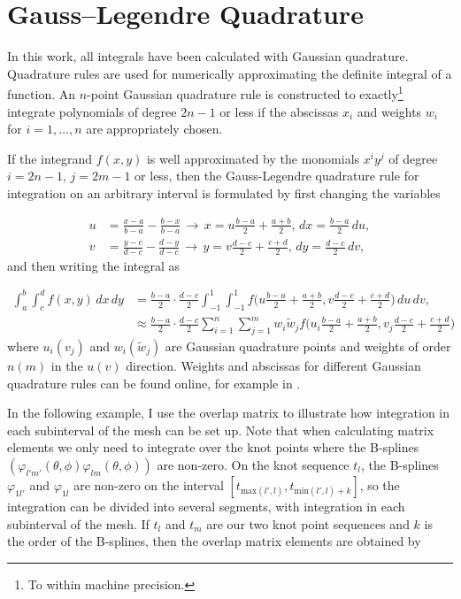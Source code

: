 \section{Gauss--Legendre Quadrature}
In this work, all integrals have been calculated with Gaussian quadrature. Quadrature rules are used for numerically approximating the definite integral of a function. An $n$-point Gaussian quadrature rule is constructed to exactly\footnote{To within machine precision.} integrate polynomials of degree $2n-1$ or less if the abscissas $x_i$ and weights $w_i$ for $i=1,\ldots,n$ are appropriately chosen. 

If the integrand $f(x,y)$ is well approximated by the monomials $x^{i}y^{j}$ of degree $i = 2n-1, \, j = 2m-1$ or less, then the Gauss-Legendre quadrature rule for integration on an arbitrary interval is formulated by first changing the variables

\begin{equation}
\begin{aligned}
u &= \frac{x-a}{b-a} - \frac{b-x}{b-a} \, \rightarrow \, x= u\frac{b-a}{2}+\frac{a+b}{2}, \,dx=\frac{b-a}{2}\,du, \\
v &= \frac{y-c}{d-c} - \frac{d-y}{d-c} \, \rightarrow \, y= v\frac{d-c}{2}+\frac{c+d}{2}, \,dy=\frac{d-c}{2}\,dv,
\end{aligned}
\end{equation} 
and then writing the integral as

\begin{equation}
\begin{aligned}
\int_{a}^{b} \int_{c}^{d}f(x,y) \,dx\,dy &= \frac{b-a}{2} \cdot \frac{d-c}{2} \int_{-1}^{1} \int_{-1}^{1}f \bigg( u\frac{b-a}{2} + \frac{a+b}{2},v\frac{d-c}{2} + \frac{c+d}{2} \bigg) \,du\,dv,\\
&\approx \frac{b-a}{2} \cdot \frac{d-c}{2} \sum_{i=1}^{n}\sum_{j=1}^{m}w_i \tilde{w}_j f\bigg( u_i\frac{b-a}{2} + \frac{a+b}{2},v_j\frac{d-c}{2} + \frac{c+d}{2}\bigg)
\end{aligned}
\end{equation}
where $u_i (v_j)$ and $w_i (\tilde{w}_j)$ are Gaussian quadrature points and weights of order $n (m)$ in the $u (v)$ direction. Weights and abscissas for different Gaussian quadrature rules can be found online, for example in \cite{NumericalRecipes}.

In the following example, I use the overlap matrix to illustrate how integration in each subinterval of the mesh can be set up. Note that when calculating matrix elements we only need to integrate over the knot points where the B-splines $(\varphi_{l'm'}(\theta,\phi)\varphi_{lm}(\theta,\phi))$ are non-zero. On the knot sequence $t_{l}$, the B-splines $\varphi_{1l'}$ and $\varphi_{1l}$ are non-zero on the interval $[t_{\text{max}(l',l)},t_{\text{min}(l',l)+k}]$, so the integration can be divided into several segments, with integration in each subinterval of the mesh. If $t_{l}$ and $t_{m}$ are our two knot point sequences and $k$ is the order of the B-splines, then the overlap matrix elements are obtained by

